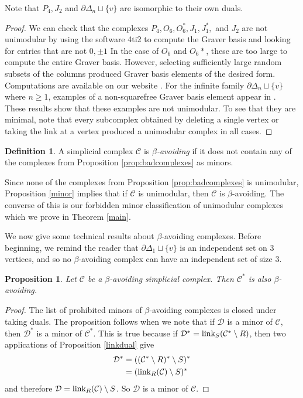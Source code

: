 \documentclass[letterpaper,12pt]{amsart}
\theoremstyle{plain}
\newtheorem{prop}[thm]{Proposition}
\theoremstyle{definition}
\newtheorem{defn}[thm]{Definition}
\theoremstyle{remark}
\newcommand{\link}{\textnormal{link}}
\begin{document}
Note that $P_4,J_2$ and $\partial\Delta_n \sqcup \{v\}$ are isomorphic 
to their own duals.

\begin{proof}
We can check that the complexes $P_4, O_6, O_6^*, J_1, J_1^*,$ and $J_2$ are not unimodular
by using the software 4ti2 \cite{4ti2} to compute the Graver basis and looking for entries that
are not $0, \pm 1$
In the case of $O_6$ and $O_6*$, these are too large to compute the
entire Graver basis.  However, selecting sufficiently large random subsets of the
columns produced Graver basis elements of the desired form.
{Computations are available on our website \cite{BernsteinWeb2016}.}
For the infinite family $\partial\Delta_n \sqcup \{v\}$ where $n \ge 1$,
examples of a non-squarefree Graver basis element  appear in \cite{bdypt}.
These results show that these examples are not unimodular.
To see that they are minimal, note that every subcomplex obtained by deleting
a single vertex or taking the link at a vertex produced a unimodular complex in
all cases.
\end{proof}



\begin{defn}
	A simplicial complex $\mathcal{C}$ is \emph{$\beta$-avoiding} if it does not contain any 
	of the complexes from Proposition \ref{prop:badcomplexes} as minors.
\end{defn}



Since none of the complexes from Proposition \ref{prop:badcomplexes} is
unimodular, Proposition \ref{minor} implies
that if $\mathcal{C}$ is unimodular, then $\mathcal{C}$ is $\beta$-avoiding.
The converse of this is our forbidden minor classification of unimodular complexes
which we prove in Theorem \ref{main}.

We now give some technical results about $\beta$-avoiding complexes.
Before beginning, we remind the reader that 
$\partial\Delta_1 \sqcup \{v\}$ is an independent set on $3$ vertices,
and so no $\beta$-avoiding complex can have an independent set of size $3$. 

\begin{prop}\label{bdual}
	Let $\mathcal{C}$ be a $\beta$-avoiding simplicial complex.
	Then $\mathcal{C}^*$ is also $\beta$-avoiding.
\end{prop}
\begin{proof}
	The list of prohibited minors of $\beta$-avoiding complexes is closed under taking duals.
	The proposition follows when we note that if $\mathcal{D}$ is a minor of $\mathcal{C}$,
	then $\mathcal{D}^*$ is a minor of $\mathcal{C}^*$.
	This is true because if $\mathcal{D}^*= \link_S(\mathcal{C}^*\setminus R)$,
	then two applications of Proposition \ref{linkdual} give
	\begin{align*}
		\mathcal{D}^* &= ((\mathcal{C}^*\setminus R)^*\setminus S)^*
		\\&= (\link_R(\mathcal{C})\setminus S)^*
	\end{align*}
	and therefore $\mathcal{D} = \link_R(\mathcal{C})\setminus S$.
	So $\mathcal{D}$ is a minor of $\mathcal{C}$.
\end{proof}
\end{document}

